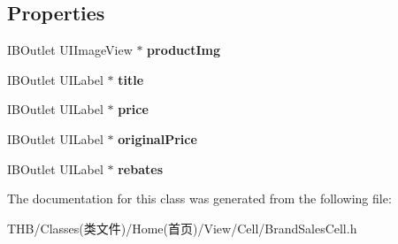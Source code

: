 \subsection*{Properties}
\begin{DoxyCompactItemize}
\item 
\mbox{\label{interface_brand_sales_cell_a67db30d9d7fb66164cf48a608e98a7a5}} 
I\+B\+Outlet U\+I\+Image\+View $\ast$ {\bfseries product\+Img}
\item 
\mbox{\label{interface_brand_sales_cell_a0c825eccc56180b85ee86d382e4784cf}} 
I\+B\+Outlet U\+I\+Label $\ast$ {\bfseries title}
\item 
\mbox{\label{interface_brand_sales_cell_a93fbdb9d8d0dd42b89db606f5abc58c9}} 
I\+B\+Outlet U\+I\+Label $\ast$ {\bfseries price}
\item 
\mbox{\label{interface_brand_sales_cell_a675d0506f3f256f736b12f5dd82845ff}} 
I\+B\+Outlet U\+I\+Label $\ast$ {\bfseries original\+Price}
\item 
\mbox{\label{interface_brand_sales_cell_a20bf6c29b2c37ead4064f12f24ee521e}} 
I\+B\+Outlet U\+I\+Label $\ast$ {\bfseries rebates}
\end{DoxyCompactItemize}


The documentation for this class was generated from the following file\+:\begin{DoxyCompactItemize}
\item 
T\+H\+B/\+Classes(类文件)/\+Home(首页)/\+View/\+Cell/Brand\+Sales\+Cell.\+h\end{DoxyCompactItemize}
